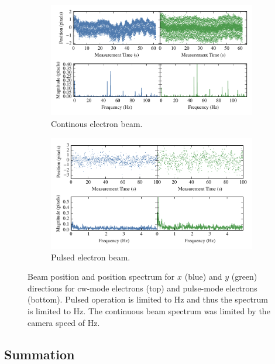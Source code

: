 \begin{figure}
    \begin{subfigure}{\linewidth}
    \centering
    \includegraphics{part2/Figs/cw_beam_stability.pdf}
    \caption{Continous electron beam.}
    \label{figure:cw_stability}
    \end{subfigure}

    \begin{subfigure}{\linewidth}
    \centering
    \includegraphics{part2/Figs/pulse_beam_stability.pdf}
    \caption{Pulsed electron beam.}
    \label{figure:pulse_stability}
    \end{subfigure}
    \caption{Beam position and position spectrum for $x$ (blue) and $y$ (green) directions for \gls{cw}-mode electrons (top) and pulse-mode electrons (bottom).
    Pulsed operation is limited to \unit[10]{Hz} and thus the spectrum is limited to \unit[5]{Hz}. The continuous beam spectrum was limited by the camera speed of \unit[240]{Hz}.}
    \label{figure:stability}
\end{figure}

\subsection{Summation}

